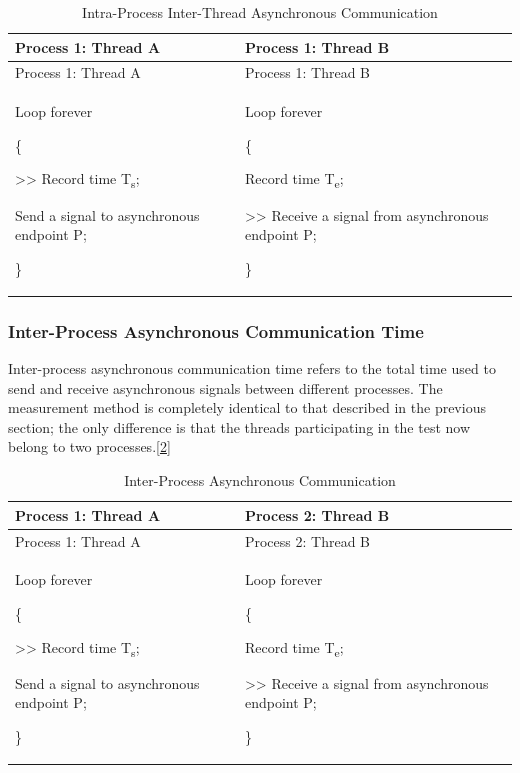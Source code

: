 \begin{xltabular}{\textwidth}{@{}>{\hsize\raggedright\arraybackslash}X>{\hsize\raggedright\arraybackslash}X@{}}
\caption{Intra-Process Inter-Thread Asynchronous Communication}\label{tab:1-9-intra-process-async-communication}\\
\toprule
Process 1: Thread A & Process 1: Thread B\tabularnewline
\endfirsthead
\toprule
Process 1: Thread A & Process 1: Thread B\tabularnewline
\midrule
\endhead
\bottomrule
\endlastfoot
Loop forever

\{

\textgreater\textgreater{} Record time T\textsubscript{s};

Send a signal to asynchronous endpoint P;

\}\strut
 & Loop forever

\{

Record time T\textsubscript{e};

\textgreater\textgreater{} Receive a signal from asynchronous endpoint P;

\}\strut
\tabularnewline
\end{xltabular}
\nopagebreak[4]

\subsubsection{Inter-Process Asynchronous Communication Time}\label{subsubsec:1-inter-process-async-communication}

Inter-process asynchronous communication time refers to the total time used to send and receive asynchronous signals between different processes. The measurement method is completely identical to that described in the previous section; the only difference is that the threads participating in the test now belong to two processes.\hyperref[cite:1-2]{{[}2{]}}

\begin{xltabular}{\textwidth}{@{}>{\hsize\raggedright\arraybackslash}X>{\hsize\raggedright\arraybackslash}X@{}}
\caption{Inter-Process Asynchronous Communication}\label{tab:1-10-inter-process-async-communication}\\
\toprule
Process 1: Thread A & Process 2: Thread B\tabularnewline
\endfirsthead
\toprule
Process 1: Thread A & Process 2: Thread B\tabularnewline
\midrule
\endhead
\bottomrule
\endlastfoot
Loop forever

\{

\textgreater\textgreater{} Record time T\textsubscript{s};

Send a signal to asynchronous endpoint P;

\}\strut
 & Loop forever

\{

Record time T\textsubscript{e};

\textgreater\textgreater{} Receive a signal from asynchronous endpoint P;

\}\strut
\tabularnewline
\end{xltabular}
\nopagebreak[4]

